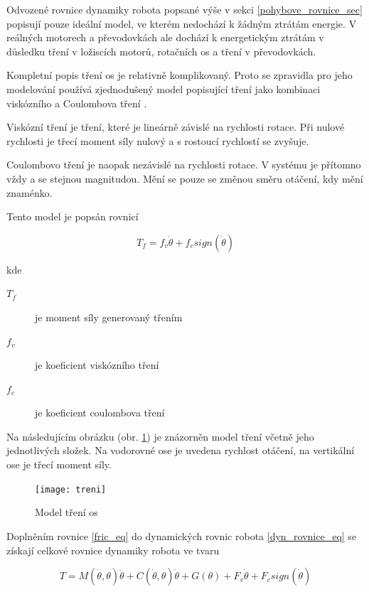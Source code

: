 Odvozené rovnice dynamiky robota popsané výše v sekci \ref{pohybove_rovnice_sec} popisují pouze ideální model, ve kterém nedochází k žádným ztrátám energie. V reálných motorech a převodovkách ale dochází k energetickým ztrátám v důsledku tření v ložiscích motorů, rotačních os a tření v převodovkách.

Kompletní popis tření os je relativně komplikovaný. Proto se zpravidla pro jeho modelování používá zjednodušený model popisující tření jako kombinaci viskózního a Coulombova tření \cite{fric_eff_analysis}. 

Viskózní tření je tření, které je lineárně závislé na rychlosti rotace. Při nulové rychlosti je třecí moment síly nulový a s rostoucí rychlostí se zvyšuje.

Coulombovo tření je naopak nezávislé na rychlosti rotace. V systému je přítomno vždy a se stejnou magnitudou. Mění se pouze se změnou směru otáčení, kdy mění znaménko.

Tento model je popsán rovnicí 

\begin{equation}
T_f = f_v\dot{\theta} + f_csign(\dot{\theta})
\label{fric_eq}
\end{equation}

kde

\begin{description}
\item[$T_f$] je moment síly generovaný třením 
\item[$f_v$] je koeficient viskózního tření 
\item[$f_c$] je koeficient coulombova tření 
\end{description}

Na následujícím obrázku (obr. \ref{treni_pic}) je znázorněn model tření včetně jeho jednotlivých složek. Na vodorovné ose je uvedena rychlost otáčení, na vertikální ose je třecí moment síly.

\begin{figure}[ht]
\texttt{[image: treni]}
\caption{Model tření os}
\label{treni_pic}
\end{figure}

Doplněním rovnice \ref{fric_eq} do dynamických rovnic robota \ref{dyn_rovnice_eq} se získají celkové rovnice dynamiky robota ve tvaru

\begin{equation}
T = M(\dot{\theta},\theta)\ddot{\theta} + C(\dot{\theta},\theta)\dot{\theta} + G(\theta) + F_v\dot{\theta} + F_csign(\dot{\theta})
\label{celkova_dyn_rovnice_eq}
\end{equation}

